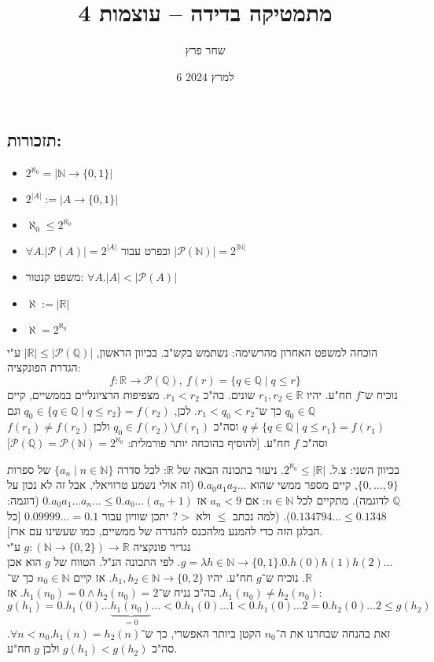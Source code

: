 \documentclass[]{article}
\title{מתמטיקה בדידה – עוצמות 4}
\author{שחר פרץ}
\date{6 למרץ 2024}
\newcommand\N     {\mathbb{N}}
\newcommand\R     {\mathbb{R}}
\newcommand\Q     {\mathbb{Q}}
\newcommand\ps    {\mathcal{P}}
\newcommand\az    {\aleph_0}
\newcommand\anz   {\aleph}
\newcommand\azz   {2^{\aleph_0}}
\begin{document}
	\maketitle
	
	\subsection*{תזכורות: }
	\begin{itemize}
		\item $ 2^{\az} = |\N \to \{0, 1\}| $
		\item $ 2^{|A|} := |A \to \{0, 1\}|$
		\item $ \az \le \azz $
		\item $ \forall A. |\ps(A)| = 2^{|A|} $ ובפרט עבור $ |\ps(\N)| = 2^{|\N|} $
		\item משפט קנטור: $ \forall A. |A| < |\ps(A)| $
		\item $ \anz := |\R| $
		\item $ \anz = \azz $
	\end{itemize}
	
	הוכחה למשפט האחרון מהרשימה: נשתמש בקש"ב. בכיוון הראשון, $ |\R| \le |\ps(\Q)| $ ע"י הגדרת הפונקציה: 
	\[ f \colon \R \to \ps(\Q), \ f(r) = \{q \in \Q \mid q \le r\} \]
	נוכיח ש־$ f $ חח"ע. יהיו $ r_1, r_2 \in \R  $ שונים. בה"כ $ r_1 < r_2 $. מצפיפות הרציונליים בממשיים, קיים $ q_0 \in \Q $ כך ש־$ r_1 < q_0 < r_2 $. לכן, $ q_0 \in \{q \in \Q \mid q \le r_2\} = f(r_2)$ וגם $ q \neq \{q \in \Q\mid q \le r_1\}  = f(r_1) $ וסה"כ $ q_0 \in f(r_2) \setminus f(r_1) $ ולכן $ f(r_1) \neq f(r_2) $ וסה"כ $ f $ חח"ע. [להוסיף בהוכחה יותר פורמלית: $ \ps(\Q) = \ps(\N) = \azz$]
	
	בכיוון השני: צ.ל. $ \azz \le |\R| $. ניעזר בתכונה הבאה של $ \R $: לכל סדרה $ \{a_n \mid n \in \N\} $ של ספרות $ \{0, \dots, 9\} $, קיים מספר ממשי שהוא $ 0.a_0a_1a_2\dots $ (זה אולי נשמע טרוויאלי, אבל זה לא נכון על $ \Q $ לדוגמה). מתקיים לכל $ n \in \N $: אם $ a_n < 9 $ אז $ 0.a_0a_1 \dots a_n \dots \le 0.a_0 \dots (a_n + 1) $ (דוגמה: $ 0.134794... \le 0.1348 $). (למה נכתב $ \le $ ולא $ > $? יתכן שוויון עבור $ 0.09999\dots = 0.1 $ [כל הבלגן הזה כדי להמנע מלהכנס להגדרה של ממשיים, כמו שעשינו עם ארז]. \\
	נגדיר פונקציה $ g \colon (\N \to \{0, 2\}) \to \R $ ע"י $ g = \lambda h \in \N \to \{0, 1\}.                                                                                                   0.h(0)h(1)h(2) \dots $. לפי התכונה הנ"ל. הטווח של $ g $ הוא אכן $ \R $. נוכיח ש־$ g $ חח"ע. יהיו $ h_1, h_2 \in \N \to \{0, 2\} $. אז קיים $ n_0 \in \N $ כך ש־$ h_1(n_0) \neq h_2(n_0) $. בה"כ נניח ש־$ h_1(n_0) = 0 \land h_2(n_0) = 2 $. אז: 
	\[ g(h_1) = 0.h_1(0) \dots \underbrace{h_1(n_0)}_{=0} \dots < 0.h_1(0) \dots 1 < 0.h_1(0) \dots 2 = 0.h_2(0) \dots 2 \le g(h_2) \]
	זאת בהנחה שבחרנו את ה־$ n_0 $ הקטן ביותר האפשרי, כך ש־$ \forall n < n_0. h_1(n) = h_2(n) $. סה"כ $ g(h_1) < g(h_2) $ ולכן $ g $ חח"ע. 
	
\end{document}

